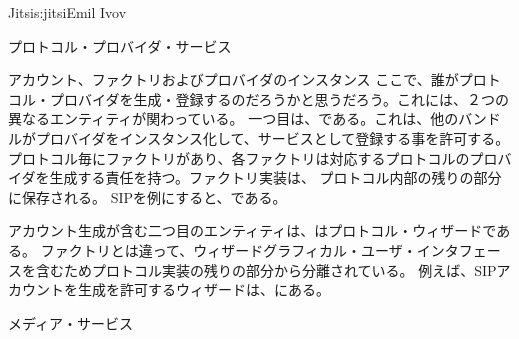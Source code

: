 \begin{aosachapter}{Jitsi}{s:jitsi}{Emil Ivov}
\begin{aosasect1}{プロトコル・プロバイダ・サービス}
\begin{aosasect2}{アカウント、ファクトリおよびプロバイダのインスタンス}
ここで、誰がプロトコル・プロバイダを生成・登録するのだろうかと思うだろう。これには、２つの異なるエンティティが関わっている。
一つ目は、である。これは、他のバンドルがプロバイダをインスタンス化して、サービスとして登録する事を許可する。
プロトコル毎にファクトリがあり、各ファクトリは対応するプロトコルのプロバイダを生成する責任を持つ。ファクトリ実装は、
プロトコル内部の残りの部分に保存される。
SIPを例にすると、である。

アカウント生成が含む二つ目のエンティティは、はプロトコル・ウィザードである。
ファクトリとは違って、ウィザードグラフィカル・ユーザ・インタフェースを含むためプロトコル実装の残りの部分から分離されている。
例えば、SIPアカウントを生成を許可するウィザードは、にある。

\end{aosasect2}

\end{aosasect1}

\begin{aosasect1}{メディア・サービス}


\end{aosasect1}
\end{aosachapter}
